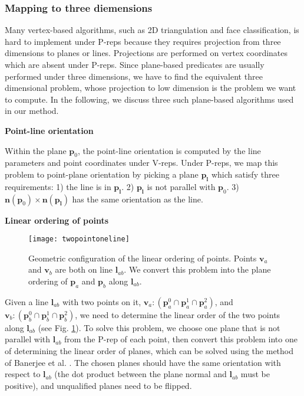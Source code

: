\subsubsection{Mapping to three diemensions}

Many vertex-based algorithms, such as 2D triangulation and face classification, is hard to implement under P-reps because they requires projection from three dimensions to planes or lines.  Projections are performed on vertex coordinates which are absent under P-reps. Since plane-based predicates \cite{bernstein2009fast,banerjee1996topologically} are usually performed under three dimensions, we have to find the equivalent three dimensional problem, whose projection to low dimension is the problem we want to compute. In the following, we discuss three such plane-based algorithms used in our method.

\vspace{0.5em}
\noindent \textbf{Point-line orientation}

\noindent Within the plane $\bm{p}_0$, the point-line orientation is computed by the line parameters and point coordinates under V-reps. Under P-reps, we map this problem to point-plane orientation by picking a plane $\bm{p_l}$ which satisfy three requirements: 1) the line is in $\bm{p_l}$. 2) $\bm{p_l}$ is not parallel with $\bm{p}_0$. 3) $\bm{n}(\bm{p}_0) \times \bm{n}(\bm{p_l})$ has the same orientation as the line.

\vspace{0.5em}
\noindent \textbf{Linear ordering of points}

\begin{figure}
  \centering
  \texttt{[image: twopointoneline]}\\
  \caption{Geometric configuration of the linear ordering of points. Points $\bm{v}_a$ and $\bm{v}_b$ are both on line $\bm{l}_{ab}$. We convert this problem into the plane ordering of $\bm{p}_a$ and $\bm{p}_b$ along $\bm{l}_{ab}$.}\label{fig:twopointoneline}
\end{figure}

\noindent Given a line $\bm{l}_{ab}$ with two points on it, $\bm{v}_a\colon(\bm{p}_a^0\cap\bm{p}_a^1\cap\bm{p}_a^2)$, and $\bm{v}_b\colon(\bm{p}_b^0\cap\bm{p}_b^1\cap\bm{p}_b^2)$, we need to determine the linear order of the two points along $\bm{l}_{ab}$ (see Fig. \ref{fig:twopointoneline}).
To solve this problem, we choose one plane that is not parallel with $\bm{l}_{ab}$ from the P-rep of each point, then convert this problem into one of determining the linear order of planes, which can be solved using the method of Banerjee et al. \cite{banerjee1996topologically}. The chosen planes should have the same orientation with respect to $\bm{l}_{ab}$ (the dot product between the plane normal and $\bm{l}_{ab}$ must be positive), and unqualified planes need to be flipped.


